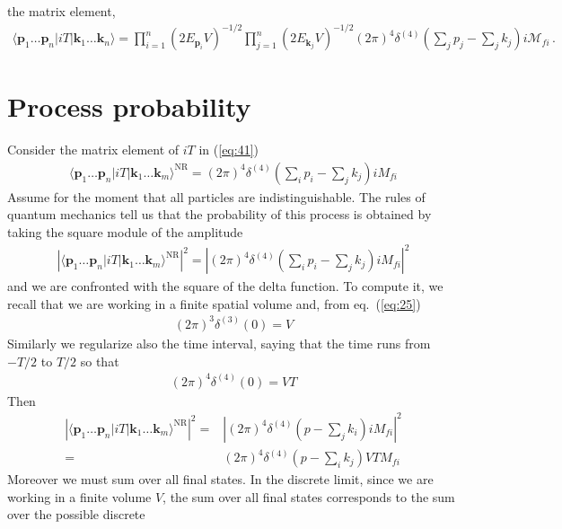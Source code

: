 the matrix element,
\begin{align}
  \label{eq:RMfi}
  \langle\mathbf{p}_1\ldots\mathbf{p}_n|i T|\mathbf{k}_1\ldots\mathbf{k}_n\rangle
=\prod_{i=1}^{n}\left(2E_{\mathbf{p}_i}V\right)^{-1/2}
\prod_{j=1}^{n}\left(2E_{\mathbf{k}_j}V\right)^{-1/2}(2\pi)^4\delta^{(4)}\left(\sum_j p_j-\sum_j k_j\right)i \mathcal{M}_{fi}\,.
\end{align}


\section{Process probability}
\label{sec:process-probability}
Consider the matrix element of $i T$ in (\ref{eq:41})
\begin{align}
  \label{eq:45}
  \langle\mathbf{p}_1\ldots\mathbf{p}_n|i T|\mathbf{k}_1\ldots\mathbf{k}_m\rangle^{\text{NR}}=(2\pi)^4\delta^{(4)}\left(\sum_i p_i-\sum_j k_j\right)i{M}_{fi}
\end{align}
Assume for the moment that all particles are indistinguishable. The rules of quantum mechanics  tell us that the probability of this process is obtained by taking the square module of the amplitude 
\begin{align}
   \left|\langle\mathbf{p}_1\ldots\mathbf{p}_n|i T|\mathbf{k}_1\ldots\mathbf{k}_m\rangle^{\text{NR}}\right|^2=
\left|(2\pi)^4\delta^{(4)}\left(\sum_i p_i-\sum_j k_j\right)i {M}_{fi}\right|^2
\end{align}
and we are confronted with the square of the delta function. To compute it, we recall that we are working in a finite spatial volume and, from eq.~(\ref{eq:25})
\begin{align}
  (2\pi)^3\delta^{(3)}(0)=V
\end{align}
Similarly we regularize also the time interval, saying that the time runs from $-T/2$ to $T/2$ so that
\begin{align}
    (2\pi)^4\delta^{(4)}(0)=V T
\end{align}
Then
\begin{align}
\label{eq:47}
     \left|\langle\mathbf{p}_1\ldots\mathbf{p}_n|i T|\mathbf{k}_1\ldots\mathbf{k}_m\rangle^{\text{NR}}\right|^2
     =&\left|(2\pi)^4\delta^{(4)}\left(p-\sum_j k_i\right)i {M}_{fi}\right|^2\nonumber\\
=&(2\pi)^4\delta^{(4)}\left(p-\sum_i k_j\right)V T  {M}_{fi}
\end{align}
Moreover we must sum over all final states. In the discrete limit, since we are
working in a finite volume $V$, the sum over all final states corresponds to  the sum over the possible discrete

